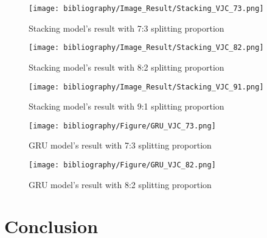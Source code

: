 \documentclass{ieeeojies}
\begin{document}
\begin{figure}[H]
  \centering
  \begin{minipage}{0.8\linewidth}
    \centering
    \texttt{[image: bibliography/Image\_Result/Stacking\_VJC\_73.png]}
    \caption{Stacking model's result with 7:3 splitting proportion}
    \label{fig8}
  \end{minipage}
\end{figure}

\begin{figure}[H]
  \centering
  \begin{minipage}{0.8\linewidth}
    \centering
    \texttt{[image: bibliography/Image\_Result/Stacking\_VJC\_82.png]}
    \caption{Stacking model's result with 8:2 splitting proportion}
    \label{fig9}
  \end{minipage}
\end{figure}

\begin{figure}[H]
  \centering
  \begin{minipage}{0.8\linewidth}
    \centering
    \texttt{[image: bibliography/Image\_Result/Stacking\_VJC\_91.png]}
    \caption{Stacking model's result with 9:1 splitting proportion}
    \label{fig8}
  \end{minipage}
\end{figure}

\begin{figure}[H]
  \centering
  \begin{minipage}{0.8\linewidth}
    \centering
    \texttt{[image: bibliography/Figure/GRU\_VJC\_73.png]}
    \caption{GRU model's result with 7:3 splitting proportion}
    \label{fig9}
  \end{minipage}
\end{figure}

\begin{figure}[H]
  \centering
  \begin{minipage}{0.8\linewidth}
    \centering
    \texttt{[image: bibliography/Figure/GRU\_VJC\_82.png]}
    \caption{GRU model's result with 8:2 splitting proportion}
    \label{fig8}
  \end{minipage}
\end{figure}




\section{Conclusion}
\end{document}
